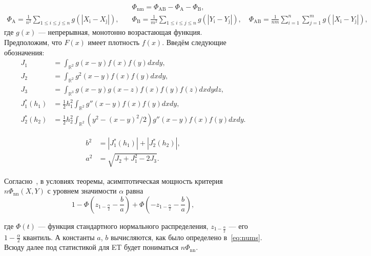 \documentclass[12pt]{article}
\theoremstyle{break}
\begin{document}
\begin{equation*}
\begin{aligned}
	&\Phi_{\mathrm{nm}} = \Phi_{\mathrm{AB}} - \Phi_{\mathrm{A}} -\Phi_{\mathrm{B}}, \quad \\
	\Phi_{\mathrm{A}} = \frac{1}{n^2} \sum_{1 \leq i \leq j \leq n} g(|X_{\mathrm{i}} - X_{\mathrm{j}}|), \quad
	&\Phi_{\mathrm{B}} = \frac{1}{m^2} \sum_{1 \leq i \leq j \leq n} g(|Y_{\mathrm{i}} - Y_{\mathrm{j}}|), \quad
	\Phi_{\mathrm{AB}} = \frac{1}{nm} \sum_{i=1}^n \sum_{j=1}^m g(|X_{\mathrm{i}} - Y_{\mathrm{j}}|),
\end{aligned}
\end{equation*}
где $g(x)$ --- непрерывная, монотонно возрастающая функция.\\

Предположим, что $F(x)$ имеет плотность $f(x)$. Введём следующие обозначения:
\begin{equation}
\begin{aligned}
	J_1 &= \int_{\mathbb{R}^2} g(x-y)f(x)f(y)dxdy,\\
	J_2 &= \int_{\mathbb{R}^2} g^2(x-y)f(x)f(y)dxdy,\\
	J_3 &= \int_{\mathbb{R}^3} g(x-y)g(x-z)f(x)f(y)f(z)dxdydz,\\
	J^*_1(h_1) &= \frac{1}{2} h^2_1 \int_{\mathbb{R}^2} g''(x-y)f(x)f(y)dxdy,\\
	J^*_2(h_2) &= \frac{1}{2} h^2_2 \int_{\mathbb{R}^2} (y^2 - (x-y)^2 / 2) g''(x-y)f(x)f(y)dxdy.
\end{aligned}
\label{eq:ints}
\end{equation}

\begin{equation}
	\begin{aligned}
		b^2 &= |J^*_1(h_1)| + |J^*_2(h_2)|,\\
		a^2 &= \sqrt{J_2 + J^2_1 - 2J_3}.
	\end{aligned}
\label{eq:nums}
\end{equation}

Согласно~\cite[Теорема 1]{melas2024}, в условиях теоремы, асимптотическая мощность критерия $n\Phi_{\mathrm{nn}}(X,Y)$ с уровнем значимости $\alpha$ равна
\begin{equation}
	1 - \Phi \left(z_{1- \frac{\alpha}{2}} - \frac{b}{a} \right) + \Phi \left( -z_{1- \frac{\alpha}{2}} - \frac{b}{a} \right), 
	\label{eq:AP}
\end{equation}



\noindent где $\Phi(t)$ --- функция стандартного нормального распределения, 
 $z_{1- \frac{\alpha}{2}}$ --- его $1- \frac{\alpha}{2}$ квантиль. А константы $a$, $b$ вычисляются, как было определено в~\eqref{eq:nums}. Всюду далее под статистикой для ET будет пониматься $n\Phi_{\mathrm{nn}}$.
 
\end{document}
